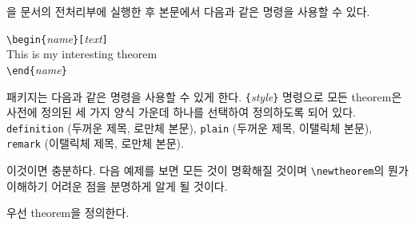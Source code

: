 을 문서의 전처리부에 실행한 후 본문에서 다음과 같은 명령을 사용할 수 있다.
\begin{code}
\verb|\begin{|\emph{name}\verb|}[|\emph{text}\verb|]|\\
This is my interesting theorem\\
\verb|\end{|\emph{name}\verb|}|     
\end{code}

 패키지는 다음과 같은 명령을 사용할 수 있게 한다.
\verb|{|\emph{style}\verb|}|
명령으로 모든 theorem은 사전에 정의된 세 가지 양식 가운데 하나를 선택하여 정의하도록 되어 있다. \texttt{definition} (두꺼운 제목, 로만체 본문),
\texttt{plain} (두꺼운 제목, 이탤릭체 본문), \texttt{remark} (이탤릭체 제목, 로만체 본문).

이것이면 충분하다. 다음 예제를 보면 모든 것이 명확해질 것이며 
\verb|\newtheorem|의 뭔가 이해하기 어려운 점을 분명하게 알게 될 것이다.

\theoremstyle{definition} \newtheorem{law}{Law}
\theoremstyle{plain}      \newtheorem{jury}[law]{Jury}
\theoremstyle{remark}     
\newtheorem*{margt}{Margaret}

우선 theorem을 정의한다.

